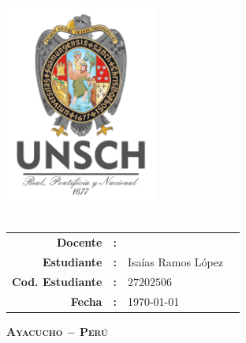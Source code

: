 \thispagestyle{empty}
\phantom{dy}
\begin{center}
    {\Large\scshape\bfseries \dyuniversity}\\
    \vspace{2.5mm}
    {\Large\scshape\bfseries \dyfaculty}\\
    \vspace{2.5mm}
    {\Large\scshape\bfseries \dydept}\\
    \vspace{8mm}
    \includegraphics[width=5cm]{Images/logo/logounsch_a.png}\\
    \vspace{2pt}
    {\Large\bfseries \dycourse}\\
    \vspace{2pt}
    \vspace{0.7cm}{\underline{\Large\bfseries\vphantom{dy}\dytitle}}
    \vspace{5pt}

    \boxabstractd{10cm}{\bfseries\large\centering \dytema}
    \vspace{1cm}
    \begin{center}
    \begin{tabular}{rcll}
        \toprule
        \bf Docente         & \bf: & \dyteacher{}       & \\[5pt]
        \bf Estudiante      & \bf: & Isaías Ramos López & \\[5pt]
        \bf Cod. Estudiante & \bf: & $27202506$         & \\[5pt]
        \bf Fecha           & \bf: & \today             & \\
        \bottomrule
    \end{tabular}
    \end{center}

    \vfill
    {\Large\scshape\bfseries Ayacucho $-$ Perú}\\
    \vspace{4mm} {\Large\bfseries\dycopyrightyear}
\end{center}

\cleardoublepage{}
